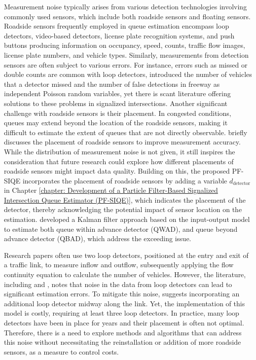 Measurement noise typically arises from various detection technologies involving commonly used sensors, which include both roadside sensors and floating sensors. Roadside sensors frequently employed in queue estimation encompass loop detectors, video-based detectors, license plate recognition systems, and push buttons producing information on occupancy, speed, counts, traffic flow images, license plate numbers, and vehicle types. Similarly, measurements from detection sensors are often subject to various errors. For instance, errors such as missed or double counts are common with loop detectors, \textcite{mihaylova2007freeway} introduced the number of vehicles that a detector missed and the number of false detections in freeway as independent Poisson random variables, yet there is scant literature offering solutions to these problems in signalized intersections. Another significant challenge with roadside sensors is their placement. In congested conditions, queues may extend beyond the location of the roadside sensors, making it difficult to estimate the extent of queues that are not directly observable. \textcite{sharma2007input} briefly discusses the placement of roadside sensors to improve measurement accuracy. While the distribution of measurement noise is not given, it still inspires the consideration that future research could explore how different placements of roadside sensors might impact data quality. Building on this, the proposed PF-SIQE incorporates the placement of roadside sensors by adding a variable $d_\text{detector}$ in Chapter \ref{chapter: Development of a Particle Filter-Based Signalized Intersection Queue Estimator (PF-SIQE)}, which indicates the placement of the detector, thereby acknowledging the potential impact of sensor location on the estimation. \textcite{anusha2022dynamical} developed a Kalman filter approach based on the input-output model to estimate both queue within advance detector (QWAD), and queue beyond advance detector (QBAD), which address the exceeding issue.

Research papers often use two loop detectors, positioned at the entry and exit of a traffic link, to measure inflow and outflow, subsequently applying the flow continuity equation to calculate the number of vehicles. However, the literature, including \textcite{anand2014data} and \textcite{vigos2008real}, notes that noise in the data from loop detectors can lead to significant estimation errors. To mitigate this noise, \textcite{vigos2008real} suggests incorporating an additional loop detector midway along the link. Yet, the implementation of this model is costly, requiring at least three loop detectors. In practice, many loop detectors have been in place for years and their placement is often not optimal. Therefore, there is a need to explore methods and algorithms that can address this noise without necessitating the reinstallation or addition of more roadside sensors, as a measure to control costs.

